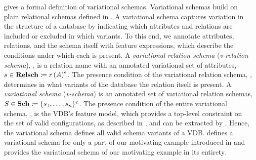  gives a formal definition of variational schemas. Variational schemas build
on plain relational schemas defined in .
%
A variational schema captures variation in the structure of a database by indicating which attributes and relations are included or excluded in which variants.
%
To this end, we annotate attributes, relations, and the schema itself with
feature expressions,
which describe the conditions under which each is present.
%
A \emph{variational relation schema} (\emph{v-relation schema}), \vRelSch, is a relation name
with an annotated variational set of attributes,
$\synDef {\vRelSch} \vRelSchSet \eqq \vRelDef$.
The presence condition of the variational relation schema, \dimMeta, determines in what
variants of the database the relation itself is present.
%
A \emph{variational schema} (\emph{v-schema}) is an annotated set of variational relation 
schemas,
$\synDef \vSch \vSchSet \eqq \vSchDef$.
The presence condition of the entire variational schema, \dimMeta, is the VDB's feature
model, which provides a top-level constraint on the set of valid
configurations, as described in , and can be extracted by \getPC \vSch.
Hence, the variational schema defines all valid schema variants of a VDB. 
 defines a variational schema for only a part of our motivating example introduced in  and
  provides the variational schema of our motivating example in its entirety. 


